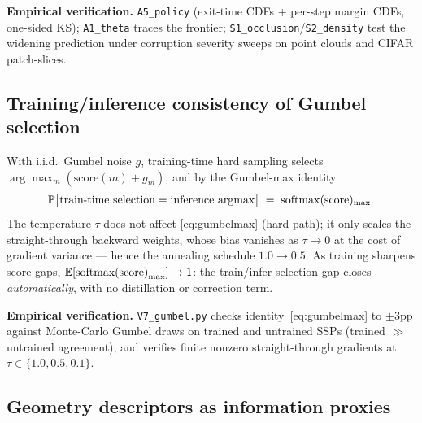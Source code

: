 \noindent\textbf{Empirical verification.} \texttt{A5\_policy} (exit-time
CDFs + per-step margin CDFs, one-sided KS); \texttt{A1\_theta} traces the
frontier; \texttt{S1\_occlusion}/\texttt{S2\_density} test the widening
prediction under corruption severity sweeps on point clouds and CIFAR
patch-slices.

\subsection{Training/inference consistency of Gumbel selection}

\begin{proposition}\label{prop:gumbel}
With i.i.d.\ Gumbel noise $g$, training-time hard sampling selects
$\arg\max_m(\mathrm{score}(m)+g_m)$, and by the Gumbel-max identity
\begin{equation}
  \mathbb{P}\big[\text{train-time selection}=\text{inference argmax}\big]
  \;=\;\mathrm{softmax}(\mathrm{score})_{\max}.
  \label{eq:gumbelmax}
\end{equation}
The temperature $\tau$ does not affect \eqref{eq:gumbelmax} (hard path);
it only scales the straight-through backward weights, whose bias vanishes
as $\tau\to0$ at the cost of gradient variance --- hence the annealing
schedule $1.0\to0.5$. As training sharpens score gaps,
$\mathbb{E}[\mathrm{softmax(score)}_{\max}]\to1$: the train/infer selection gap
closes \emph{automatically}, with no distillation or correction term.
\end{proposition}

\noindent\textbf{Empirical verification.} \texttt{V7\_gumbel.py} checks
identity~\eqref{eq:gumbelmax} to $\pm3$pp against Monte-Carlo Gumbel draws
on trained and untrained SSPs (trained $\gg$ untrained agreement), and
verifies finite nonzero straight-through gradients at
$\tau\in\{1.0,0.5,0.1\}$.

\subsection{Geometry descriptors as information proxies}

